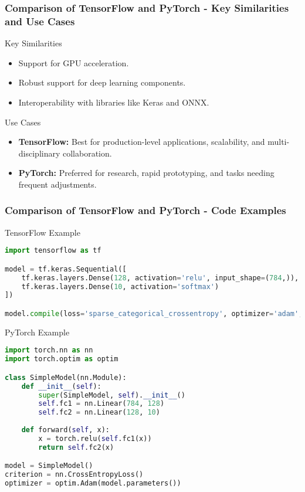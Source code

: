\documentclass[aspectratio=169]{beamer}
\begin{document}
\begin{frame}[fragile]
    \frametitle{Comparison of TensorFlow and PyTorch - Key Similarities and Use Cases}
    \begin{block}{Key Similarities}
        \begin{itemize}
            \item Support for GPU acceleration.
            \item Robust support for deep learning components.
            \item Interoperability with libraries like Keras and ONNX.
        \end{itemize}
    \end{block}

    \begin{block}{Use Cases}
        \begin{itemize}
            \item \textbf{TensorFlow:} Best for production-level applications, scalability, and multi-disciplinary collaboration.
            \item \textbf{PyTorch:} Preferred for research, rapid prototyping, and tasks needing frequent adjustments.
        \end{itemize}
    \end{block}
\end{frame}

\begin{frame}[fragile]
    \frametitle{Comparison of TensorFlow and PyTorch - Code Examples}
    \begin{block}{TensorFlow Example}
        \begin{lstlisting}[language=Python]
import tensorflow as tf

model = tf.keras.Sequential([
    tf.keras.layers.Dense(128, activation='relu', input_shape=(784,)),
    tf.keras.layers.Dense(10, activation='softmax')
])

model.compile(loss='sparse_categorical_crossentropy', optimizer='adam', metrics=['accuracy'])
        \end{lstlisting}
    \end{block}

    \begin{block}{PyTorch Example}
        \begin{lstlisting}[language=Python]
import torch.nn as nn
import torch.optim as optim

class SimpleModel(nn.Module):
    def __init__(self):
        super(SimpleModel, self).__init__()
        self.fc1 = nn.Linear(784, 128)
        self.fc2 = nn.Linear(128, 10)
    
    def forward(self, x):
        x = torch.relu(self.fc1(x))
        return self.fc2(x)

model = SimpleModel()
criterion = nn.CrossEntropyLoss()
optimizer = optim.Adam(model.parameters())
        \end{lstlisting}
    \end{block}
\end{frame}
\end{document}
